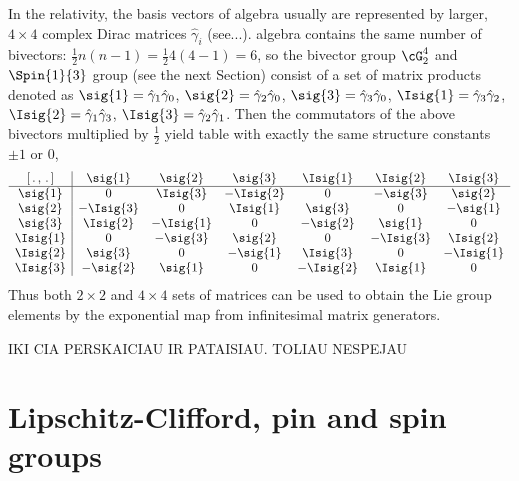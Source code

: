 \begin{example}
In the relativity, the basis vectors of  algebra usually are
represented by larger, $4\times 4$ complex Dirac matrices
$\hat{\gamma}_i$ (see...).   algebra contains the same
number of bivectors: $\tfrac{1}{2}n(n-1)=\tfrac{1}{2}4(4-1)=6$, so
the bivector group $\cG_2^4$ and $\Spin{1}{3}$ group (see the next
Section) consist of a set of matrix products denoted as
 $\sig{1}=\hat{\gamma}_1\hat{\gamma}_0$,
 $\sig{2}=\hat{\gamma}_2\hat{\gamma}_0$,
 $\sig{3}=\hat{\gamma}_3\hat{\gamma}_0$,
 $\Isig{1}=\hat{\gamma}_3\hat{\gamma}_2$,
 $\Isig{2}=\hat{\gamma}_1\hat{\gamma}_3$,
 $\Isig{3}=\hat{\gamma}_2\hat{\gamma}_1$.
Then the commutators of the above bivectors multiplied by
$\tfrac{1}{2}$  yield table with exactly the same structure constants $\pm 1$ or $0$,
\[\begin{array}{c|cccccc}
[\,.\, ,\, .\,]&\sig{1}&\sig{2}&\sig{3}&\Isig{1}&\Isig{2}&\Isig{3}\\
\hline
\sig{1}&0&\Isig{3}&-\Isig{2}&0&-\sig{3}&\sig{2}\\
\sig{2}&-\Isig{3}&0&\Isig{1}&\sig{3}&0&-\sig{1}\\
\sig{3}&\Isig{2}&-\Isig{1}&0&-\sig{2}&\sig{1}&0\\
\Isig{1}&0&-\sig{3}&\sig{2}&0&-\Isig{3}&\Isig{2}\\
\Isig{2}&\sig{3}&0&-\sig{1}&\Isig{3}&0&-\Isig{1}\\
\Isig{3}&-\sig{2}&\sig{1}&0&-\Isig{2}&\Isig{1}&0
\end{array}\]
Thus both $2\times 2$ and $4\times 4$ sets of matrices can be used
to obtain the Lie group elements by the exponential map from
infinitesimal matrix generators.
\end{example}
%

IKI CIA PERSKAICIAU IR PATAISIAU. TOLIAU NESPEJAU



%
\section{Lipschitz-Clifford, pin and spin groups}

